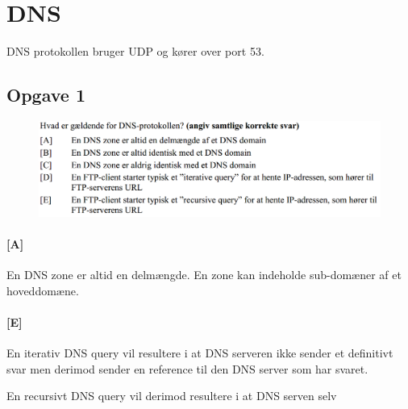 \section{DNS}
DNS protokollen bruger UDP og kører over port 53.

\subsection{Opgave 1}
\begin{figure}[H]
	\centering
	\includegraphics[width=\linewidth]{figs/dns/SE15OP2}
\end{figure}

\paragraph{[A]}
En DNS zone er altid en delmængde. En zone kan indeholde sub-domæner af et hoveddomæne.

\paragraph{[E]}
En iterativ DNS query vil resultere i at DNS serveren ikke sender et definitivt svar men derimod sender en reference til den DNS server som har svaret.

En recursivt DNS query vil derimod resultere i at DNS serven selv 

